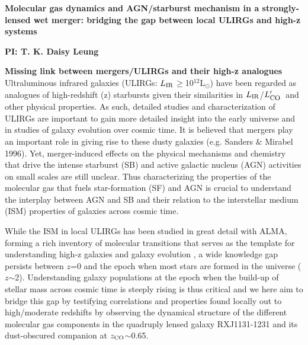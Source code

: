 \documentclass[12pt,a4paper]{article}
\newcommand{\Lsun}{\mbox{L$_{\odot}$}\xspace}
\newcommand{\LIR}{\mbox{$L_{\rm IR}$}\xspace}
\newcommand{\Lp}[1][CO]{\mbox{$L^{\prime}_\textrm{\fontsize{8pt}{12pt}\selectfont{#1}}$}}
\begin{document}
\pagestyle{plain}
 
\begin{center}
{\large{\bf
{ 
Molecular gas dynamics and AGN/starburst mechanism in a
strongly-lensed wet merger: bridging the gap between local ULIRGs and high-z systems}
}}
\end{center}
\vspace{-0.545em}
\centerline{\normalsize{\bf PI: 
{T. K. Daisy Leung}}} 
\vspace{0.1em} {\bf Missing link between mergers/ULIRGs and their high-z analogues} 
Ultraluminous infrared galaxies (ULIRGs: \LIR$\geq$10$^{12}$\Lsun) have been
regarded as analogues of high-redshift (z) starbursts given their
similarities in \LIR/\Lp\ and other physical properties.
As such, detailed studies and characterization of ULIRGs are important 
to gain more detailed insight into the early universe and in studies of galaxy evolution over cosmic time.
It is believed that mergers play an important role in giving rise to these dusty galaxies
(e.g. Sanders \& Mirabel 1996). Yet, merger-induced effects on the physical mechanisms and chemistry 
that drive the intense starburst (SB) and active galactic nucleus (AGN) activities on small scales are still unclear.
Thus characterizing the properties of the molecular gas that fuels star-formation (SF) and AGN is
crucial to understand the interplay between AGN and SB
and their relation to the interstellar medium (ISM) properties of galaxies across cosmic time.

While the ISM in local ULIRGs has been studied in great detail with ALMA,
forming a rich inventory of molecular transitions that serves as the template for 
understanding high-z galaxies and galaxy evolution \citep[e.g.][]{Rangwala15a}, a wide knowledge gap persists
between $z$=0 and the epoch when most stars are formed in the universe ($z$$\sim$2). 
Understanding galaxy populations at the epoch when the build-up of stellar mass across cosmic
time is steeply rising is thus critical and we here aim to bridge this gap by testifying
correlations and properties found locally out to high/moderate redshifts by observing the 
dynamical structure of the different molecular gas components
in the quadruply lensed galaxy RXJ1131-1231 and its dust-obscured 
companion at $z_{\rm CO}$$\sim$0.65.
\end{document}
